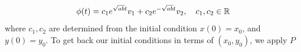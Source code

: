 \documentclass[12pt]{article}
\begin{document}
\begin{equation}
  \phi(t) = c_1e^{\sqrt{ab}t}v_1 + c_2 e^{-\sqrt{ab}t}v_2,\quad c_1,c_2 \in \mathbb{R}
\end{equation}
where $c_1,c_2$ are determined from the initial condition $x(0)=x_0$, and $y(0)=y_0$. To get back our initial conditions in terms of $(x_0,y_0)$, we apply $P$
\end{document}
